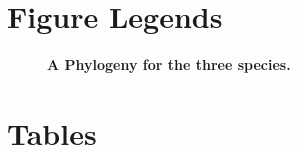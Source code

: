 \documentclass[10pt]{article}\usepackage[]{graphicx}\usepackage[]{color}
\begin{document}


\section*{Figure Legends}
\begin{figure}[!ht]
\begin{center}
\end{center}
\caption{
{\bf A Phylogeny for the three species.}
}
\label{fig:phylomatic}
\end{figure}


\section*{Tables}

\end{document}
